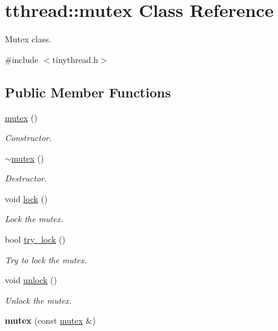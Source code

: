 \hypertarget{classtthread_1_1mutex}{}\section{tthread\+:\+:mutex Class Reference}
\label{classtthread_1_1mutex}


Mutex class.  




{\ttfamily \#include $<$tinythread.\+h$>$}

\subsection*{Public Member Functions}
\begin{DoxyCompactItemize}
\item 
\hyperlink{classtthread_1_1mutex_a5f264cc02eada94f1e34c051ba739dd6}{mutex} ()\hypertarget{classtthread_1_1mutex_a5f264cc02eada94f1e34c051ba739dd6}{}\label{classtthread_1_1mutex_a5f264cc02eada94f1e34c051ba739dd6}

\begin{DoxyCompactList}\small\item\em Constructor. \end{DoxyCompactList}\item 
\hyperlink{classtthread_1_1mutex_a77eed89cdb2fc397d7d36945124ead51}{$\sim$mutex} ()\hypertarget{classtthread_1_1mutex_a77eed89cdb2fc397d7d36945124ead51}{}\label{classtthread_1_1mutex_a77eed89cdb2fc397d7d36945124ead51}

\begin{DoxyCompactList}\small\item\em Destructor. \end{DoxyCompactList}\item 
void \hyperlink{classtthread_1_1mutex_a41add9fd340426bfe5a7eac19e326e2a}{lock} ()
\begin{DoxyCompactList}\small\item\em Lock the mutex. \end{DoxyCompactList}\item 
bool \hyperlink{classtthread_1_1mutex_afe904e063e778a4f513f709c93b8fbb2}{try\+\_\+lock} ()
\begin{DoxyCompactList}\small\item\em Try to lock the mutex. \end{DoxyCompactList}\item 
void \hyperlink{classtthread_1_1mutex_a1727e54dc48cc8598fe7908366a562a6}{unlock} ()
\begin{DoxyCompactList}\small\item\em Unlock the mutex. \end{DoxyCompactList}\item 
{\bfseries mutex} (const \hyperlink{classtthread_1_1mutex}{mutex} \&)\hypertarget{classtthread_1_1mutex_a0216bd810c9f26070aca164a7982fefe}{}\label{classtthread_1_1mutex_a0216bd810c9f26070aca164a7982fefe}


\end{DoxyCompactItemize}

